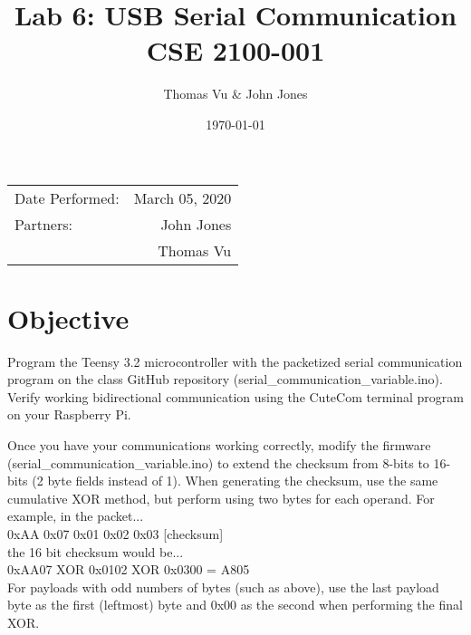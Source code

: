 \documentclass{article}
\title{Lab 6: USB Serial Communication \\ CSE 2100-001} %
\author{Thomas Vu & John Jones} %
\date{\today} %
\begin{document}
\maketitle %

\begin{center}
\begin{tabular}{l r}
Date Performed: & March 05, 2020 \\ %
Partners: & John Jones \\ %
& Thomas Vu \\
\end{tabular}
\end{center}



\section{Objective}

Program the Teensy 3.2 microcontroller with the packetized serial communication program on the class GitHub repository (serial\_communication\_variable.ino). Verify working bidirectional communication using the CuteCom terminal program on your Raspberry Pi.

Once you have your communications working correctly, modify the firmware (serial\_communication\_variable.ino) to extend the checksum from 8-bits to 16-bits (2 byte fields instead of 1). When generating the checksum, use the same cumulative XOR method, but perform using two bytes for each operand. For example, in the packet... \\

0xAA 0x07 0x01 0x02 0x03 [checksum]\\

the 16 bit checksum would be...\\

0xAA07 XOR 0x0102 XOR 0x0300 = A805\\

For payloads with odd numbers of bytes (such as above), use the last payload byte as the first (leftmost) byte and 0x00 as the second when performing the final XOR.
\end{document}
